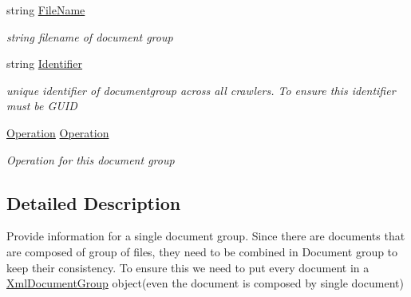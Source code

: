 \begin{DoxyCompactItemize}
string \hyperlink{class_metainfo_e_u_cases_1_1_xml_document_group_a1c3693931b6b015fc34d24baa9e1a3ca}{File\-Name}
\begin{DoxyCompactList}\small\item\em string filename of document group \end{DoxyCompactList}\item 
string \hyperlink{class_metainfo_e_u_cases_1_1_xml_document_group_ae35a0c0f53de8daeb10ddb6d6a70cb49}{Identifier}
\begin{DoxyCompactList}\small\item\em unique identifier of documentgroup across all crawlers. To ensure this identifier must be G\-U\-I\-D \end{DoxyCompactList}\item 
\hyperlink{namespace_metainfo_e_u_cases_a31e7a82bcb29caae96833aaadc2809c5}{Operation} \hyperlink{class_metainfo_e_u_cases_1_1_xml_document_group_ab2ccda383cf6a14bfae6d47b182737bb}{Operation}
\begin{DoxyCompactList}\small\item\em Operation for this document group \end{DoxyCompactList}\end{DoxyCompactItemize}


\subsection{Detailed Description}
Provide information for a single document group. Since there are documents that are composed of group of files, they need to be combined in Document group to keep their consistency. To ensure this we need to put every document in a \hyperlink{class_metainfo_e_u_cases_1_1_xml_document_group}{Xml\-Document\-Group} object(even the document is composed by single document) 



